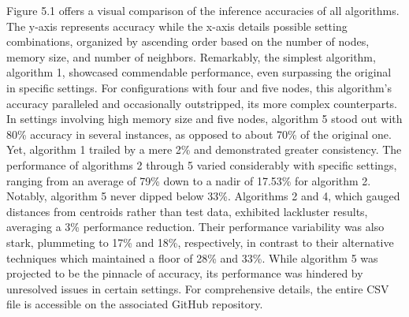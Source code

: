 Figure 5.1 offers a visual comparison of the inference accuracies of all algorithms. The y-axis represents accuracy while the x-axis details possible setting combinations, organized by ascending order based on the number of nodes, memory size, and number of neighbors. Remarkably, the simplest algorithm, algorithm 1, showcased commendable performance, even surpassing the original in specific settings. For configurations with four and five nodes, this algorithm's accuracy paralleled and occasionally outstripped, its more complex counterparts. In settings involving high memory size and five nodes, algorithm 5 stood out with 80\% accuracy in several instances, as opposed to about 70\% of the original one. Yet, algorithm 1 trailed by a mere 2\% and demonstrated greater consistency. The performance of algorithms 2 through 5 varied considerably with specific settings, ranging from an average of 79\% down to a nadir of 17.53\% for algorithm 2. Notably, algorithm 5 never dipped below 33\%. Algorithms 2 and 4, which gauged distances from centroids rather than test data, exhibited lackluster results, averaging a 3\% performance reduction. Their performance variability was also stark, plummeting to 17\% and 18\%, respectively, in contrast to their alternative techniques which maintained a floor of 28\% and 33\%. While algorithm 5 was projected to be the pinnacle of accuracy, its performance was hindered by unresolved issues in certain settings. For comprehensive details, the entire CSV file is accessible on the associated GitHub repository.


\newpage




